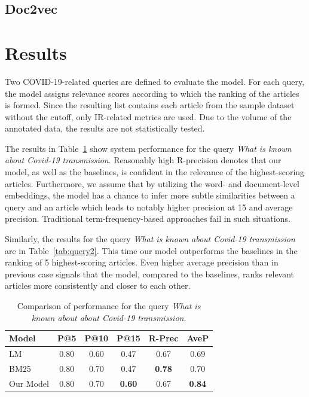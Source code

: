\documentclass[10pt, a4paper]{article}
\begin{document}
	\subsection{Doc2vec}
	
	
	\section{Results}
	
	Two COVID-19-related queries are defined to evaluate the model. For each query, the model assigns relevance scores according to which the ranking of the articles is formed. Since the resulting list contains each article from the sample dataset without the cutoff, only IR-related metrics are used. Due to the volume of the annotated data, the results are not statistically tested. 
	
	The results in Table~\ref{tab:query1} show system performance for the query \textit{What is known about Covid-19 transmission}. Reasonably high R-precision denotes that our model, as well as the baselines, is confident in the relevance of the highest-scoring articles. Furthermore, we assume that by utilizing the word- and document-level embeddings, the model has a chance to infer more subtle similarities between a query and an article which leads to notably higher precision at 15 and average precision. Traditional term-frequency-based approaches fail in such situations.
	
	Similarly, the results for the query \textit{What is known about Covid-19 transmission} are in Table~\ref{tab:query2}. This time our model outperforms the baselines in the ranking of 5 highest-scoring articles. Even higher average precision than in previous case signals that the model, compared to the baselines, ranks relevant articles more consistently and closer to each other.
	
	\begin{table}
		\caption{Comparison of performance for the query \textit{What is known about about Covid-19 transmission}.}
		\label{tab:query1}
		\begin{center}
			\begin{tabular}{lccccc}
				\toprule
				Model & P@5 & P@10 & P@15 & R-Prec & AveP \\
				\midrule
				LM & 0.80 & 0.60 & 0.47 & 0.67 & 0.69  \\
				BM25 & 0.80 & 0.70 & 0.47 & \textbf{0.78} & 0.70 \\
				Our Model & 0.80 & 0.70 & \textbf{0.60} & 0.67 & \textbf{0.84} \\
				\bottomrule
			\end{tabular}
		\end{center}
	\end{table}
	
\end{document}
